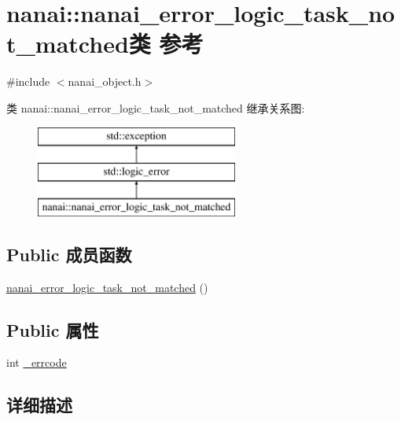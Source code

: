 \hypertarget{classnanai_1_1nanai__error__logic__task__not__matched}{}\section{nanai\+:\+:nanai\+\_\+error\+\_\+logic\+\_\+task\+\_\+not\+\_\+matched类 参考}
\label{classnanai_1_1nanai__error__logic__task__not__matched}


{\ttfamily \#include $<$nanai\+\_\+object.\+h$>$}

类 nanai\+:\+:nanai\+\_\+error\+\_\+logic\+\_\+task\+\_\+not\+\_\+matched 继承关系图\+:\begin{figure}[H]
\begin{center}
\leavevmode
\includegraphics[height=3.000000cm]{classnanai_1_1nanai__error__logic__task__not__matched}
\end{center}
\end{figure}
\subsection*{Public 成员函数}
\begin{DoxyCompactItemize}
\item 
\hyperlink{classnanai_1_1nanai__error__logic__task__not__matched_a94f76745dd25d220afd5dea030f07496}{nanai\+\_\+error\+\_\+logic\+\_\+task\+\_\+not\+\_\+matched} ()
\end{DoxyCompactItemize}
\subsection*{Public 属性}
\begin{DoxyCompactItemize}
\item 
int \hyperlink{classnanai_1_1nanai__error__logic__task__not__matched_a3e73ce12d629068c63360384585d62c9}{\+\_\+errcode}
\end{DoxyCompactItemize}


\subsection{详细描述}


